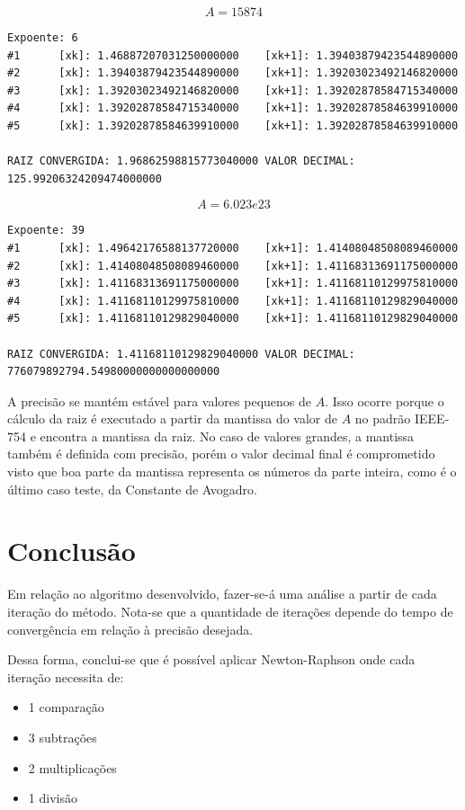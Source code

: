 	$$A = 15874$$
	\begin{Verbatim}[fontsize=\footnotesize]
Expoente: 6
#1      [xk]: 1.46887207031250000000    [xk+1]: 1.39403879423544890000
#2      [xk]: 1.39403879423544890000    [xk+1]: 1.39203023492146820000
#3      [xk]: 1.39203023492146820000    [xk+1]: 1.39202878584715340000
#4      [xk]: 1.39202878584715340000    [xk+1]: 1.39202878584639910000
#5      [xk]: 1.39202878584639910000    [xk+1]: 1.39202878584639910000

RAIZ CONVERGIDA: 1.96862598815773040000 VALOR DECIMAL: 125.99206324209474000000
	\end{Verbatim}
	$$A = 6.023e23$$
	\begin{Verbatim}[fontsize=\footnotesize]
Expoente: 39
#1      [xk]: 1.49642176588137720000    [xk+1]: 1.41408048508089460000
#2      [xk]: 1.41408048508089460000    [xk+1]: 1.41168313691175000000
#3      [xk]: 1.41168313691175000000    [xk+1]: 1.41168110129975810000
#4      [xk]: 1.41168110129975810000    [xk+1]: 1.41168110129829040000
#5      [xk]: 1.41168110129829040000    [xk+1]: 1.41168110129829040000

RAIZ CONVERGIDA: 1.41168110129829040000 VALOR DECIMAL: 776079892794.54980000000000000000
	\end{Verbatim}

	A precisão se mantém estável para valores pequenos de $A$. Isso ocorre porque o cálculo da raiz
	é executado a partir da mantissa do valor de $A$ no padrão IEEE-754 e encontra a mantissa da raiz.
	No caso de valores grandes, a mantissa também é definida com precisão, porém o valor decimal final é comprometido
	visto que boa parte da mantissa representa os números da parte inteira, como é o último caso teste, da Constante de Avogadro.

	\section{Conclusão}
	Em relação ao algoritmo desenvolvido, fazer-se-á uma análise a partir de cada iteração do método.
	Nota-se que a quantidade de iterações depende do tempo de convergência em relação à precisão
	desejada.

	Dessa forma, conclui-se que é possível aplicar Newton-Raphson onde cada iteração necessita de:
	\begin{itemize}
		\item 1 comparação
		\item 3 subtrações
		\item 2 multiplicações
		\item 1 divisão
	\end{itemize}

